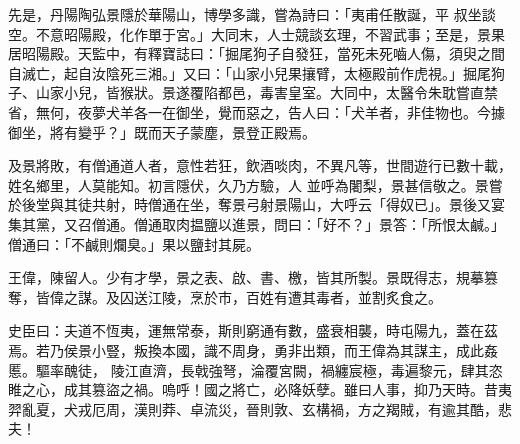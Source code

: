 \begin{pinyinscope}
 先是，丹陽陶弘景隱於華陽山，博學多識，嘗為詩曰：「夷甫任散誕，平
 叔坐談空。不意昭陽殿，化作單于宮。」大同末，人士競談玄理，不習武事；至是，景果居昭陽殿。天監中，有釋寶誌曰：「掘尾狗子自發狂，當死未死嚙人傷，須臾之間自滅亡，起自汝陰死三湘。」又曰：「山家小兒果攘臂，太極殿前作虎視。」掘尾狗子、山家小兒，皆猴狀。景遂覆陷都邑，毒害皇室。大同中，太醫令朱耽嘗直禁省，無何，夜夢犬羊各一在御坐，覺而惡之，告人曰：「犬羊者，非佳物也。今據御坐，將有變乎？」既而天子蒙塵，景登正殿焉。



 及景將敗，有僧通道人者，意性若狂，飲酒啖肉，不異凡等，世間遊行已數十載，姓名鄉里，人莫能知。初言隱伏，久乃方驗，人
 並呼為闍梨，景甚信敬之。景嘗於後堂與其徒共射，時僧通在坐，奪景弓射景陽山，大呼云「得奴已」。景後又宴集其黨，又召僧通。僧通取肉揾鹽以進景，問曰：「好不？」景答：「所恨太鹹。」僧通曰：「不鹹則爛臭。」果以鹽封其屍。



 王偉，陳留人。少有才學，景之表、啟、書、檄，皆其所製。景既得志，規摹篡奪，皆偉之謀。及囚送江陵，烹於市，百姓有遭其毒者，並割炙食之。



 史臣曰：夫道不恆夷，運無常泰，斯則窮通有數，盛衰相襲，時屯陽九，蓋在茲焉。若乃侯景小豎，叛換本國，識不周身，勇非出類，而王偉為其謀主，成此姦慝。驅率醜徒，
 陵江直濟，長戟強弩，淪覆宮闕，禍纏宸極，毒遍黎元，肆其恣睢之心，成其篡盜之禍。嗚呼！國之將亡，必降妖孽。雖曰人事，抑乃天時。昔夷羿亂夏，犬戎厄周，漢則莽、卓流災，晉則敦、玄構禍，方之羯賊，有逾其酷，悲夫！



\end{pinyinscope}